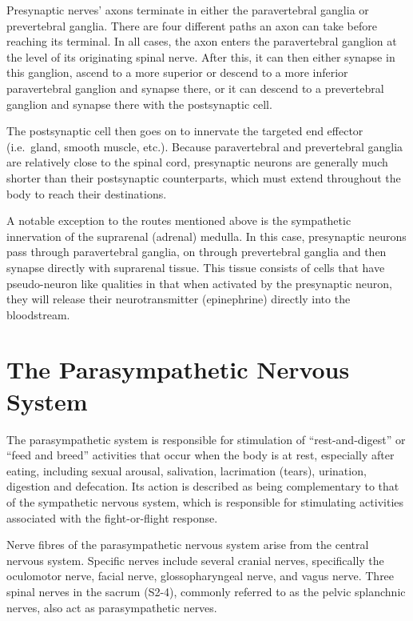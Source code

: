 Presynaptic nerves' axons terminate in either the paravertebral ganglia or prevertebral ganglia. There are four different paths an axon can take before reaching its terminal. In all cases, the axon enters the paravertebral ganglion at the level of its originating spinal nerve. After this, it can then either synapse in this ganglion, ascend to a more superior or descend to a more inferior paravertebral ganglion and synapse there, or it can descend to a prevertebral ganglion and synapse there with the postsynaptic cell.

The postsynaptic cell then goes on to innervate the targeted end effector (i.e.~gland, smooth muscle, etc.). Because paravertebral and prevertebral ganglia are relatively close to the spinal cord, presynaptic neurons are generally much shorter than their postsynaptic counterparts, which must extend throughout the body to reach their destinations.

A notable exception to the routes mentioned above is the sympathetic innervation of the suprarenal (adrenal) medulla. In this case, presynaptic neurons pass through paravertebral ganglia, on through prevertebral ganglia and then synapse directly with suprarenal tissue. This tissue consists of cells that have pseudo-neuron like qualities in that when activated by the presynaptic neuron, they will release their neurotransmitter (epinephrine) directly into the bloodstream.

\hypertarget{the-parasympathetic-nervous-system}{%
\section{The Parasympathetic Nervous System}\label{the-parasympathetic-nervous-system}}

The parasympathetic system is responsible for stimulation of ``rest-and-digest'' or ``feed and breed'' activities that occur when the body is at rest, especially after eating, including sexual arousal, salivation, lacrimation (tears), urination, digestion and defecation. Its action is described as being complementary to that of the sympathetic nervous system, which is responsible for stimulating activities associated with the fight-or-flight response.

Nerve fibres of the parasympathetic nervous system arise from the central nervous system. Specific nerves include several cranial nerves, specifically the oculomotor nerve, facial nerve, glossopharyngeal nerve, and vagus nerve. Three spinal nerves in the sacrum (S2-4), commonly referred to as the pelvic splanchnic nerves, also act as parasympathetic nerves.

